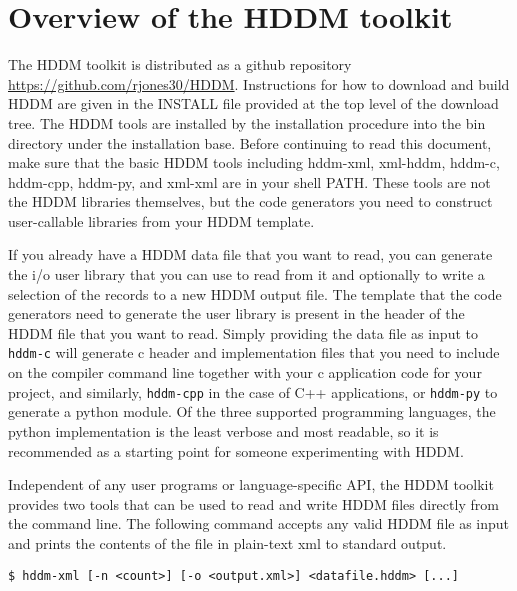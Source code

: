 \documentclass{revtex4}
\begin{document}
\section{Overview of the HDDM toolkit}

The HDDM toolkit is distributed as a github repository \url{https://github.com/rjones30/HDDM}.
Instructions for how to download and build HDDM are given in the INSTALL file
provided at the top level of the download tree. The HDDM tools are installed
by the installation procedure into the bin directory under the installation
base. Before continuing to read this document, make sure that the basic HDDM tools
including hddm-{}xml, xml-{}hddm, hddm-{}c, hddm-{}cpp, hddm-{}py, and xml-{}xml
are in your shell PATH. These tools are not the HDDM libraries themselves, but
the code generators you need to construct user-callable libraries from your 
HDDM template.

If you already have a HDDM data file that you want to read, you can generate
the i/o user library that you can use to read from it and optionally to write
a selection of the records to a new HDDM output file. The template that the
code generators need to generate the user library is present in the header of
the HDDM file that you want to read. Simply providing the data file as input
to \texttt{hddm-c} will generate c header and implementation files that you
need to include on the compiler command line together with your c application
code for your project, and similarly, \texttt{hddm-cpp} in the case of C++
applications, or \texttt{hddm-py} to generate a python module. Of the three
supported programming languages, the python implementation is the least
verbose and most readable, so it is recommended as a starting point for
someone experimenting with HDDM.

Independent of any user programs or language-{}specific API, the HDDM toolkit
provides two tools that can be used to read and write HDDM files directly from
the command line. The following command accepts any valid HDDM file as input
and prints the contents of the file in plain-{}text xml to standard output.

\vspace{0.5cm}
\begin{minipage}{12cm}
\begin{verbatim}
$ hddm-xml [-n <count>] [-o <output.xml>] <datafile.hddm> [...]
\end{verbatim}
\end{minipage}
\vspace{0.5cm}
\end{document}
